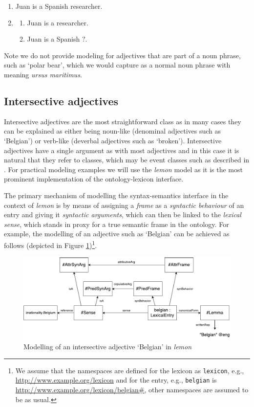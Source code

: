 \documentclass[11pt]{article}
\begin{document}
\begin{enumerate}[resume]
\item Juan is a Spanish researcher. \label{ex:juan}
\item \begin{enumerate}
\item Juan is a researcher.
\item Juan is a Spanish $?$.
\end{enumerate}
\label{ex:juan_frames}
\end{enumerate}

Note we do not provide modeling for adjectives that are part of a noun phrase,
such as `polar bear', which we would capture as a normal noun phrase with 
meaning \emph{ursus maritimus}.

\subsection{Intersective adjectives}

Intersective adjectives are the most straightforward class as in many cases they 
can be explained as either being noun-like (denominal adjectives such as 
`Belgian') or verb-like (deverbal adjectives such as `broken'). Intersective 
adjectives have a single argument as with most adjectives and in this case it is 
natural that they refer to classes, which may be event classes such as described 
in \cite{mccrae2014design}. For practical modeling examples we will use the
\emph{lemon} model as it is the most prominent implementation of the 
ontology-lexicon interface.

The primary mechanism of modelling the syntax-semantics interface in the context 
of \emph{lemon} is by means of assigning a \emph{frame} as a \emph{syntactic 
behaviour} of an entry and giving it \emph{syntactic arguments}, which can then 
be linked to the \emph{lexical sense}, which stands in proxy for a true semantic 
frame in the ontology. For example, the modelling of an adjective such as 
`Belgian' can be achieved as follows (depicted in Figure 
\ref{example-belgian})\footnote{We assume that the namespaces are defined for 
the lexicon as {\tt lexicon}, e.g., \url{http://www.example.org/lexicon}
and for the entry, e.g., {\tt belgian} is \url{http://www.example.org/lexicon/belgian#},
other namespaces are assumed to be as usual.}.

\begin{figure}
\includegraphics[width=\textwidth]{belgian-example}
\caption{Modelling of an intersective adjective `Belgian' in \emph{lemon}\label{example-belgian}}
\end{figure}
\end{document}
